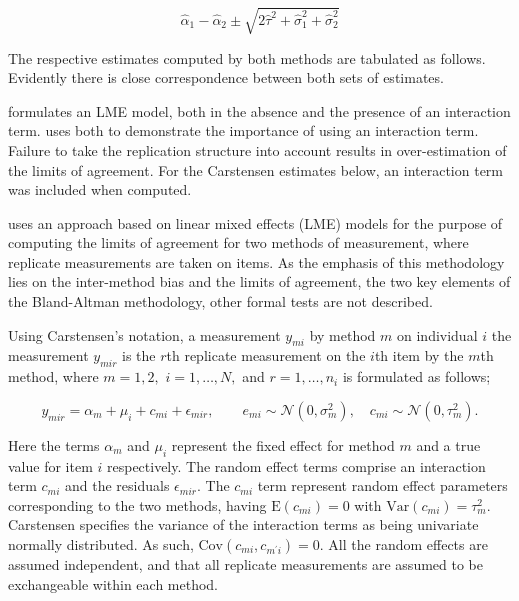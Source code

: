 \documentclass{report}
\begin{document}
	\[
	\hat{\alpha}_1 - \hat{\alpha}_2 \pm \sqrt{2 \hat{\tau}^2 +
		\hat{\sigma}^2_1 + \hat{\sigma}^2_2}
	\]
	
	
	
	
	The respective estimates computed by both methods are tabulated as follows. Evidently there is close correspondence between both sets of estimates.
	
	\citet{BXC2008} formulates an LME model, both in the absence and the presence of an interaction term.\citet{BXC2008} uses both to demonstrate the importance of using an interaction term. Failure to take the replication structure into
	account results in over-estimation of the limits of agreement. 
	For the Carstensen estimates below, an interaction term was included when computed.
	
	
	
	
	
	\citet{BXC2008} uses an approach based on linear mixed effects (LME) models for the purpose of computing the limits of agreement for two methods of measurement, where replicate measurements are taken on items. As the emphasis of this methodology lies on the inter-method bias and the limits of agreement, the two key elements of the Bland-Altman methodology, other formal tests are not described.
	
	Using Carstensen's notation, a measurement $y_{mi}$ by method $m$ on individual $i$ the measurement $y_{mir} $ is the $r$th replicate measurement on the $i$th item by the $m$th method, where $m=1,2,$ $i=1,\ldots,N,$ and $r = 1,\ldots,n_i$ is formulated as follows;
	
	\begin{equation}
	y_{mir}  = \alpha_{m} + \mu_{i} + c_{mi} + \epsilon_{mir}, \qquad  e_{mi}
	\sim \mathcal{N}(0,\sigma^{2}_{m}), \quad c_{mi} \sim \mathcal{N}(0,\tau^{2}_{m}).
	\end{equation}
	
	Here the terms $\alpha_{m}$ and $\mu_{i}$ represent the fixed effect for method $m$ and a true value for item $i$ respectively. The random effect terms comprise an interaction term $c_{mi}$ and the residuals $\epsilon_{mir}$.
	The $c_{mi}$ term represent random effect parameters corresponding to the two methods, having $\mathrm{E}(c_{mi})=0$ with $\mathrm{Var}(c_{mi})=\tau^2_m$. Carstensen specifies the variance of the interaction terms as being univariate normally distributed. As such, $\mathrm{Cov}(c_{mi}, c_{m^\prime i})= 0.$ All the random effects are assumed independent, and that all replicate measurements are assumed to be exchangeable within each method.
	
\end{document}
